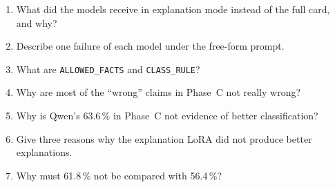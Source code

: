 \begin{selfcheck}
\begin{enumerate}
  \item What did the models receive in explanation mode instead of the full card, and why?
  \item Describe one failure of each model under the free-form prompt.
  \item What are \texttt{ALLOWED\_FACTS} and \texttt{CLASS\_RULE}?
  \item Why are most of the ``wrong'' claims in Phase~C not really wrong?
  \item Why is Qwen's 63.6\,\% in Phase~C not evidence of better classification?
  \item Give three reasons why the explanation LoRA did not produce better explanations.
  \item Why must 61.8\,\% not be compared with 56.4\,\%?
\end{enumerate}
\end{selfcheck}
